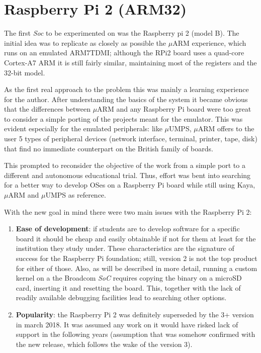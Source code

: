 \documentclass[12pt,a4paper,openright,twoside]{report}
\begin{document}
\section{Raspberry Pi 2 (ARM32)}
The first \textit{Soc} to be experimented on was the Raspberry pi 2 (model B).
 The initial idea was to replicate as closely as possible the
$\mu$ARM experience, which runs on an emulated ARM7TDMI; although the RPi2 
board uses a quad-core Cortex-A7 ARM it is still fairly similar, maintaining most
of the registers and the 32-bit model.

As the first real approach to the problem this was mainly a learning experience
for the author. After understanding the basics of the system it became
obvious that the differences between $\mu$ARM and any Raspberry Pi board were 
too great to consider a simple porting of the projects meant for the emulator.
This was evident especially for the emulated peripherals: like $\mu$UMPS, $\mu$ARM offers
to the user 5 types of peripheral devices (network interface, terminal, printer,
tape, disk) that find no immediate counterpart on the British family of boards.

This prompted to reconsider the objective of the work from a simple port to
a different and autonomous educational trial. Thus, effort was bent into searching
for a better way to develop OSes on a Raspberry Pi board while still using
Kaya, $\mu$ARM and $\mu$UMPS as reference.

With the new goal in mind there were two main issues with the Raspberry Pi 2:
\begin{enumerate}
    \item \textbf{Ease of development}: if students are to develop software
            for a specific board it should be cheap and easily obtainable if 
            not for them at least for the institution they study under.
            These characteristics are the signature of success for the Raspberry Pi
            foundation; still, version 2 is not the top product for either of
            those.
            Also, as will be described in more detail, running a custom kernel 
            on a the Broadcom \textit{SoC} requires copying the binary on a 
            microSD card, inserting it and resetting the board. This, together
            with the lack of readily available debugging facilities lead to searching
            other options.
    \item \textbf{Popularity}: the Raspberry Pi 2 was definitely superseded by the
            3+ version in march 2018. It was assumed any work on it would have
            risked lack of support in the following years (assumption that was
            somehow confirmed with the new release, which follows the wake of 
            the version 3).
\end{enumerate}
\end{document}
